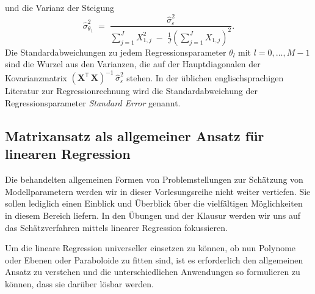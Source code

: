 und die Varianz der Steigung
\begin{equation}
\hat \sigma^2_{\theta_1} \; = \; 
\frac{\hat \sigma^2_\varepsilon}{\sum\limits_{j=1}^J X_{1,j}^2 \; - \; 
	\frac{1}{J}\left(\sum\limits_{j=1}^J X_{1,j}\right)^2} .
\end{equation}
Die Standardabweichungen zu jedem Regressionsparameter $\theta_l$ mit $l = 0,\dots,M-1$ sind
die Wurzel aus den Varianzen, die auf der Hauptdiagonalen der Kovarianzmatrix 
$\left( \mathbf{X}^\mathsf{T}  \, \mathbf{X} \right)^{-1} \, \hat \sigma_{\varepsilon}^2$
stehen. In der üblichen englischsprachigen Literatur zur Regressionrechnung wird
die Standardabweichung der Regressionsparameter \textsl{Standard Error} genannt.
\subsection{Matrixansatz als allgemeiner Ansatz für linearen Regression}
Die behandelten allgemeinen Formen von Problemstellungen zur Schätzung von Modellparametern
werden wir in dieser Vorlesungsreihe nicht weiter vertiefen. Sie sollen lediglich einen Einblick
und Überblick über die vielfältigen Möglichkeiten in diesem Bereich liefern.
In den Übungen und der Klausur werden
wir uns auf das Schätzverfahren mittels linearer Regression fokussieren.


Um die lineare Regression universeller einsetzen zu können, ob nun Polynome oder
Ebenen oder Paraboloide zu fitten sind, ist es erforderlich den allgemeinen Ansatz zu verstehen
und die unterschiedlichen Anwendungen so formulieren zu können, dass sie darüber lösbar werden.

